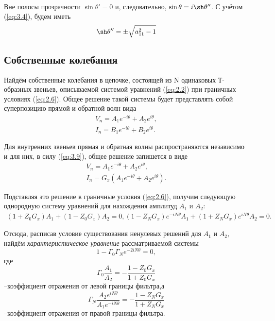 Вне полосы прозрачности $\sin\theta'=0$ и, следовательно, $\sin\theta=i\sh\theta''$. С учётом (\ref{eq:3.4}), будем иметь
\begin{equation}
	\sh\theta''=\pm\sqrt{a_{11}^2-1}
\end{equation}

\subsection{Собственные колебания}
Найдём собственные колебания в цепочке, состоящей из N одинаковых Т-образных звеньев, описываемой системой уравнений (\ref{eq:2.2}) при граничных условиях (\ref{eq:2.6}). Общее решение такой системы будет представлять собой суперпозицию прямой и обратной волн вида
\begin{gather}
	V_n=A_1e^{-i\theta}+A_2e^{i\theta}, \\
	I_n=B_1e^{-i\theta}+B_2e^{i\theta}.
\end{gather}

Для внутренних звеньев прямая и обратная волны распространяются независимо и для них, в силу (\ref{eq:3.9}), общее решение запишется в виде
\begin{gather}
V_n=A_1e^{-i\theta}+A_2e^{i\theta}, \\
I_n=G_x(A_1e^{-i\theta}+A_2e^{i\theta}).
\end{gather}

Подставляя это решение в граничные условия (\ref{eq:2.6}),
получим следующую однородную систему уравнений для нахождения амплитуд $A_1$ и $A_2$:
\begin{gather}
	(1+Z_0G_x)A_1+(1-Z_0G_x)A_2=0,
	(1-Z_NG_x)e^{-iN\theta}A_1+(1+Z_NG_x)e^{iN\theta}A_2=0.
\end{gather}

Отсюда, расписав условие существования ненулевых решений для $A_1$ и $A_2$, найдём \textit{характеристическое уравнение} рассматриваемой системы
\begin{equation}
\label{eq:4.4}
	1-\Gamma_0\Gamma_Ne^{-2iN\theta}=0,
\end{equation}
где
\begin{equation}
	\Gamma_0\frac{A_1}{A_2}=-\frac{1-Z_0G_x}{1+Z_0G_x}
\end{equation}
--коэффициент отражения от левой границы фильтра,а
\begin{equation}
	\Gamma_N\frac{A_2e^{iN\theta}}{A_1e^{-iN\theta}}=
	-\frac{1-Z_NG_x}{1+Z_NG_x}
\end{equation}
--коэффициент отражения от правой границы фильтра.

